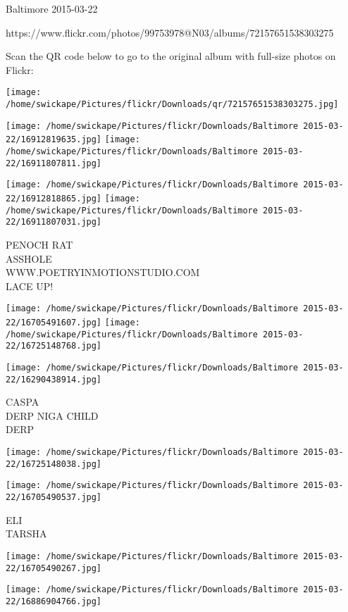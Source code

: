 \documentclass[10pt,letterpaper]{article}
\begin{document}
Baltimore 2015-03-22

https://www.flickr.com/photos/99753978@N03/albums/72157651538303275

Scan the QR code below to go to the original album with full-size photos on Flickr:

\texttt{[image: /home/swickape/Pictures/flickr/Downloads/qr/72157651538303275.jpg]}
\pagebreak

\texttt{[image: /home/swickape/Pictures/flickr/Downloads/Baltimore 2015-03-22/16912819635.jpg]}
\texttt{[image: /home/swickape/Pictures/flickr/Downloads/Baltimore 2015-03-22/16911807811.jpg]}

\texttt{[image: /home/swickape/Pictures/flickr/Downloads/Baltimore 2015-03-22/16912818865.jpg]}
\texttt{[image: /home/swickape/Pictures/flickr/Downloads/Baltimore 2015-03-22/16911807031.jpg]}

PENOCH RAT\\
ASSHOLE\\
WWW.POETRYINMOTIONSTUDIO.COM\\
LACE UP!
\pagebreak

\texttt{[image: /home/swickape/Pictures/flickr/Downloads/Baltimore 2015-03-22/16705491607.jpg]}
\texttt{[image: /home/swickape/Pictures/flickr/Downloads/Baltimore 2015-03-22/16725148768.jpg]}

\vspace{0.25in}
\texttt{[image: /home/swickape/Pictures/flickr/Downloads/Baltimore 2015-03-22/16290438914.jpg]}

CASPA\\
DERP NIGA CHILD\\
DERP
\pagebreak

\texttt{[image: /home/swickape/Pictures/flickr/Downloads/Baltimore 2015-03-22/16725148038.jpg]}

\vspace{0.25in}
\texttt{[image: /home/swickape/Pictures/flickr/Downloads/Baltimore 2015-03-22/16705490537.jpg]}

ELI\\
TARSHA
\pagebreak

\texttt{[image: /home/swickape/Pictures/flickr/Downloads/Baltimore 2015-03-22/16705490267.jpg]}

\vspace{0.25in}
\texttt{[image: /home/swickape/Pictures/flickr/Downloads/Baltimore 2015-03-22/16886904766.jpg]}
\end{document}
